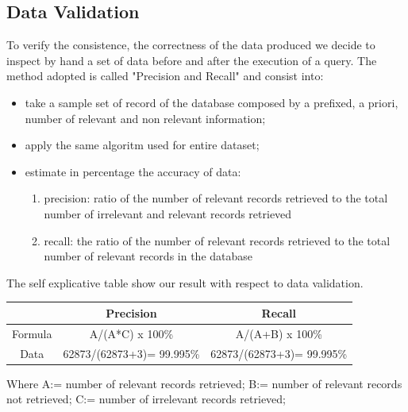 \documentclass[conference, onecolumn]{IEEEtran}
\begin{document}
\subsection{Data Validation}
To verify the consistence, the correctness of the data produced we decide to inspect by hand a set of data before and after the execution of a query. The method adopted is called "Precision and Recall" and consist into:
\begin{itemize}
	\item take a sample set of record of the database composed by a prefixed, a priori, number of relevant and non relevant information;
	\item apply the same algoritm used for entire dataset;
	\item estimate in percentage the accuracy of data:
	\begin{enumerate}
	\item precision: ratio of the number of relevant records retrieved to the total number of irrelevant and relevant records retrieved
	\item recall: the ratio of the number of relevant records retrieved to the total number of relevant records in the database
\end{enumerate}
\end{itemize}

The self explicative table show our result with respect to data validation.
\medskip

\begin{tabular}{|c|c|c|}
	\hline & Precision & Recall \\ 
	\hline Formula & A/(A*C) x 100\% & A/(A+B) x 100\% \\ 
	\hline Data & 62873/(62873+3)= 99.995\% & 62873/(62873+3)= 99.995\% \\ 
	\hline 
\end{tabular}
\medskip

Where A:= number of relevant records retrieved; B:= number of relevant records not retrieved; C:= number of irrelevant records retrieved;
\end{document}
